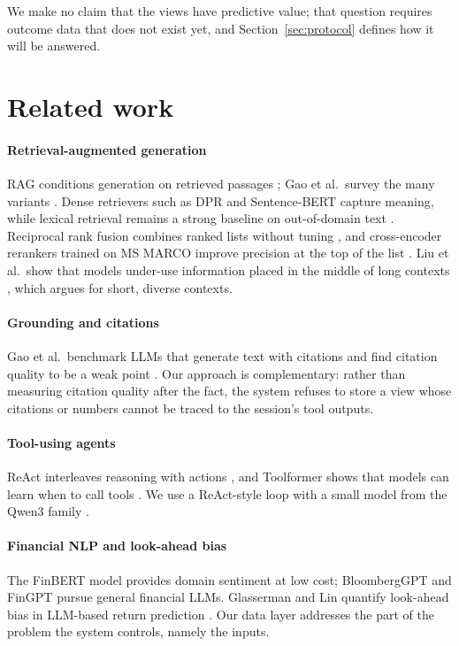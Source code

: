 \documentclass[preprint,11pt]{elsarticle}
\begin{document}
We make no claim that the views have predictive value; that question requires outcome data that does not
exist yet, and Section~\ref{sec:protocol} defines how it will be answered.

\section{Related work}
\label{sec:related}

\paragraph{Retrieval-augmented generation} RAG conditions generation on retrieved passages
\cite{lewis2020retrievalaugmented}; Gao et al.\ survey the many variants \cite{gao2023retrievalaugmented}.
Dense retrievers such as DPR \cite{karpukhin2020dense} and Sentence-BERT \cite{reimers2019sentencebert}
capture meaning, while lexical retrieval remains a strong baseline on out-of-domain text \cite{thakur2021beir}.
Reciprocal rank fusion combines ranked lists without tuning \cite{cormack2009rrf}, and cross-encoder rerankers
trained on MS MARCO improve precision at the top of the list \cite{nogueira2019passage, bajaj2016marco}.
Liu et al.\ show that models under-use information placed in the middle of long contexts \cite{liu2023lost},
which argues for short, diverse contexts.

\paragraph{Grounding and citations} Gao et al.\ benchmark LLMs that generate text with citations and find
citation quality to be a weak point \cite{gao2023enabling}. Our approach is complementary: rather than
measuring citation quality after the fact, the system refuses to store a view whose citations or numbers
cannot be traced to the session's tool outputs.

\paragraph{Tool-using agents} ReAct interleaves reasoning with actions \cite{yao2022react}, and Toolformer
shows that models can learn when to call tools \cite{schick2023toolformer}. We use a ReAct-style loop with a
small model from the Qwen3 family \cite{yang2025qwen3}.

\paragraph{Financial NLP and look-ahead bias} The FinBERT model \cite{araci2019finbert} provides domain
sentiment at low cost; BloombergGPT \cite{wu2023bloomberggpt} and FinGPT \cite{yang2023fingpt} pursue general financial LLMs.
Glasserman and Lin quantify look-ahead bias in LLM-based return prediction \cite{glasserman2023assessing}.
Our data layer addresses the part of the problem the system controls, namely the inputs.
\end{document}
